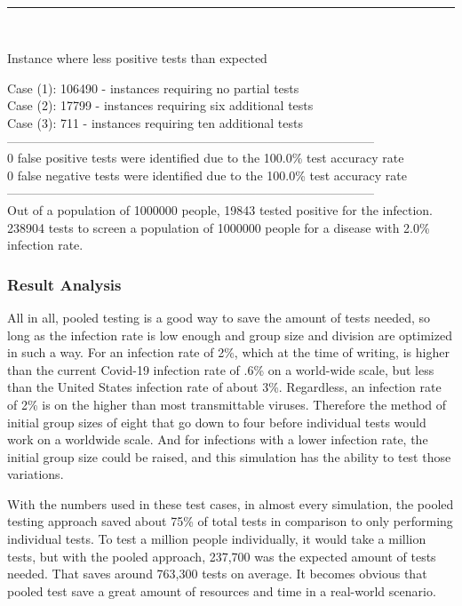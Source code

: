 \documentclass[letterpaper, 10pt,DIV=13]{scrartcl}
\numberwithin{equation}{section} %
\numberwithin{figure}{section} %
\numberwithin{table}{section} %
\begin{document}
\\
\begin{center}
\rule{12cm}{.4pt}
\end{center}
\\
\begin{displayquote}
\begin{center}
    Instance where less positive tests than expected
\end{center}
Case (1): 106490 - instances requiring no partial tests\\
Case (2): 17799 - instances requiring six additional tests\\
Case (3): 711 - instances requiring ten additional tests\\
-----------------------------------------------------------------------------------------\\
0 false positive tests were identified due to the 100.0\% test accuracy rate\\
0 false negative tests were identified due to the 100.0\% test accuracy rate\\
-----------------------------------------------------------------------------------------\\
Out of a population of 1000000 people, 19843 tested positive for the infection.\\
238904 tests to screen a population of 1000000 people for a disease with 2.0\% infection rate.\\
\end{displayquote}

\subsubsection{Result Analysis}
All in all, pooled testing is a good way to save the amount of tests needed, so long as the infection rate is low enough and group size and division are optimized in such a way.  For an infection rate of 2\%, which at the time of writing, is higher than the current Covid-19 infection rate of .6\% on a world-wide scale, but less than the United States infection rate of about 3\%.  Regardless, an infection rate of 2\% is on the higher than most transmittable viruses.  Therefore the method of initial group sizes of eight that go down to four before individual tests would work on a worldwide scale.  And for infections with a lower infection rate, the initial group size could be raised, and this simulation has the ability to test those variations.  

With the numbers used in these test cases, in almost every simulation, the pooled testing approach saved about 75\% of total tests in comparison to only performing individual tests.  To test a million people individually, it would take a million tests, but with the pooled approach, 237,700 was the expected amount of tests needed.  That saves around 763,300 tests on average.  It becomes obvious that pooled test save a great amount of resources and time in a real-world scenario.
\end{document}
